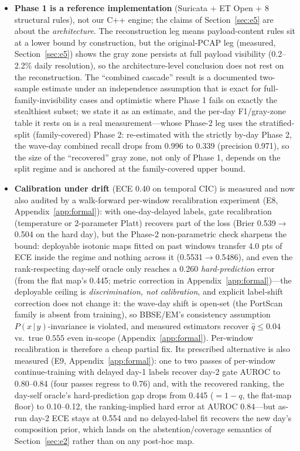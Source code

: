 \documentclass[sigconf,anonymous=false]{acmart}
\begin{document}
\begin{itemize}
\item \textbf{Phase 1 is a reference implementation} (Suricata + ET Open + 8 structural rules), not our C++ engine; the claims of Section~\ref{sec:e5} are about the \emph{architecture}. The reconstruction leg means payload-content rules sit at a lower bound by construction, but the original-PCAP leg (measured, Section~\ref{sec:e5}) shows the gray zone persists at full payload visibility (0.2--2.2\% daily resolution), so the architecture-level conclusion does not rest on the reconstruction. The ``combined cascade'' result is a documented two-sample estimate under an independence assumption that is exact for full-family-invisibility cases and optimistic where Phase 1 fails on exactly the stealthiest subset; we state it as an estimate, and the per-day F1/gray-zone table it rests on is a real measurement---whose Phase-2 leg uses the stratified-split (family-covered) Phase 2: re-estimated with the strictly by-day Phase 2, the wave-day combined recall drops from 0.996 to 0.339 (precision 0.971), so the size of the ``recovered'' gray zone, not only of Phase 1, depends on the split regime and is anchored at the family-covered upper bound.

\item \textbf{Calibration under drift} (ECE 0.40 on temporal CIC) is measured and now also audited by a walk-forward per-window recalibration experiment (E8, Appendix~\ref{app:formal}): with one-day-delayed labels, gate recalibration (temperature or 2-parameter Platt) recovers part of the loss (Brier 0.539$\to$0.504 on the hard day), but the Phase-2 non-parametric check sharpens the bound: deployable isotonic maps fitted on past windows transfer 4.0 pts of ECE inside the regime and nothing across it (0.5531$\to$0.5486), and even the rank-respecting day-self oracle only reaches a 0.260 \emph{hard-prediction} error (from the flat map's 0.445; metric correction in Appendix~\ref{app:formal})---the deployable ceiling is \emph{discrimination, not calibration}, and explicit label-shift correction does not change it: the wave-day shift is open-set (the PortScan family is absent from training), so BBSE/EM's consistency assumption $P(x\,|\,y)$-invariance is violated, and measured estimators recover $\widehat{q}\le0.04$ vs.\ true $0.555$ even in-scope (Appendix~\ref{app:formal}). Per-window recalibration is therefore a cheap partial fix. Its prescribed alternative is also measured (E9, Appendix~\ref{app:formal}): one to two passes of per-window continue-training with delayed day-1 labels recover day-2 gate AUROC to 0.80--0.84 (four passes regress to 0.76) and, with the recovered ranking, the day-self oracle's hard-prediction gap drops from 0.445 ($=1{-}q$, the flat-map floor) to 0.10--0.12, the ranking-implied hard error at AUROC 0.84---but as-run day-2 ECE stays at 0.554 and no delayed-label fit recovers the new day's composition prior, which lands on the abstention/coverage semantics of Section~\ref{sec:e2} rather than on any post-hoc map.


\end{itemize}
\end{document}
